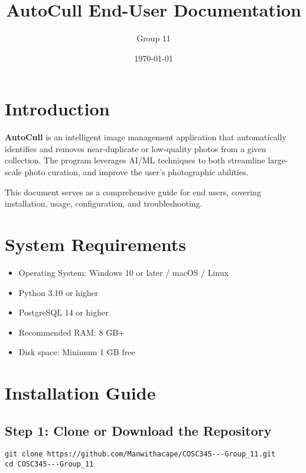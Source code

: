 \documentclass[12pt,a4paper]{article}
\title{\textbf{AutoCull End-User Documentation}}
\author{Group 11}
\date{\today}
\begin{document}
\maketitle
\tableofcontents
\newpage

\section{Introduction}

\textbf{AutoCull} is an intelligent image management application that automatically identifies and removes near-duplicate or low-quality photos from a given collection. The program leverages AI/ML techniques to both streamline large-scale photo curation, and improve the user's photographic abilities.

This document serves as a comprehensive guide for end users, covering installation, usage, configuration, and troubleshooting.

\section{System Requirements}

\begin{itemize}
    \item Operating System: Windows 10 or later / macOS / Linux
    \item Python 3.10 or higher
    \item PostgreSQL 14 or higher
    \item Recommended RAM: 8 GB+
    \item Disk space: Minimum 1 GB free
\end{itemize}


\section{Installation Guide}

\subsection{Step 1: Clone or Download the Repository}
\begin{lstlisting}[style=console]
git clone https://github.com/Manwithacape/COSC345---Group_11.git
cd COSC345---Group_11
\end{lstlisting}
\end{document}
